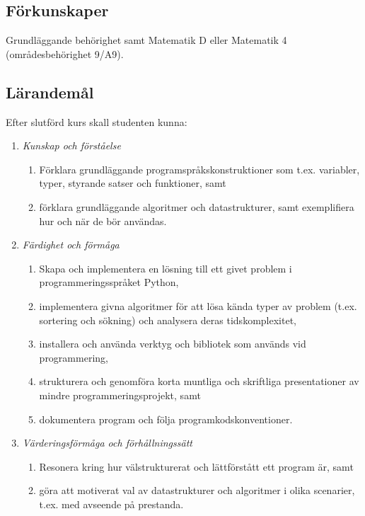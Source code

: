 \subsection*{Förkunskaper}

Grundläggande behörighet samt Matematik D eller Matematik 4
(områdesbehörighet 9/A9).

\subsection*{Lärandemål}

Efter slutförd kurs skall studenten kunna:

\begin{enumerate}
\def\labelenumi{\Alph{enumi}.}
\tightlist
\item
  \emph{Kunskap och förståelse}

  \begin{enumerate}
  \def\labelenumii{\Alph{enumi}.\arabic{enumii}.}
  \tightlist
  \item
    Förklara grundläggande programspråkskonstruktioner som t.ex.
    variabler, typer, styrande satser och funktioner, samt
  \item
    förklara grundläggande algoritmer och datastrukturer, samt
    exemplifiera hur och när de bör användas.
  \end{enumerate}
\item
  \emph{Färdighet och förmåga}

  \begin{enumerate}
  \def\labelenumii{\Alph{enumi}.\arabic{enumii}.}
  \tightlist
  \item
    Skapa och implementera en lösning till ett givet problem i
    programmeringsspråket Python,
  \item
    implementera givna algoritmer för att lösa kända typer av problem
    (t.ex. sortering och sökning) och analysera deras tidskomplexitet,
  \item
    installera och använda verktyg och bibliotek som används vid
    programmering,
  \item
    strukturera och genomföra korta muntliga och skriftliga
    presentationer av mindre programmeringsprojekt, samt
  \item
    dokumentera program och följa programkodskonventioner.
  \end{enumerate}
\item
  \emph{Värderingsförmåga och förhållningssätt}

  \begin{enumerate}
  \def\labelenumii{\Alph{enumi}.\arabic{enumii}.}
  \tightlist
  \item
    Resonera kring hur välstrukturerat och lättförstått ett program är,
    samt
  \item
    göra att motiverat val av datastrukturer och algoritmer i olika
    scenarier, t.ex. med avseende på prestanda.
  \end{enumerate}
\end{enumerate}

